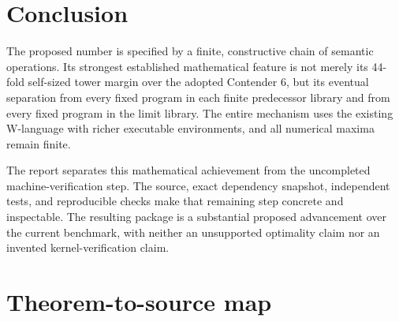 \documentclass[11pt,letterpaper]{article}
\theoremstyle{definition}
\begin{document}
\section{Conclusion}

The proposed number is specified by a finite, constructive chain of semantic
operations. Its strongest established mathematical feature is not merely its
44-fold self-sized tower margin over the adopted Contender 6, but its eventual
separation from every fixed program in each finite predecessor library and
from every fixed program in the limit library. The entire mechanism uses the
existing W-language with richer executable environments, and all numerical
maxima remain finite.

The report separates this mathematical achievement from the uncompleted
machine-verification step. The source, exact dependency snapshot, independent
tests, and reproducible checks make that remaining step concrete and
inspectable. The resulting package is a substantial proposed advancement over
the current benchmark, with neither an unsupported optimality claim nor an
invented kernel-verification claim.

\appendix
\section{Theorem-to-source map}
\end{document}

